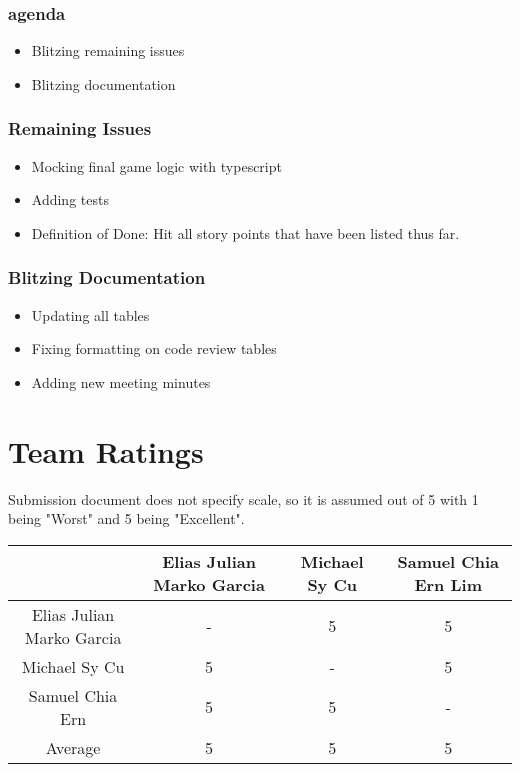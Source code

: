 \documentclass[11pt]{article}
\begin{document}
\subsubsection*{agenda}
\label{sec:org32cc65f}
\begin{itemize}
\item Blitzing remaining issues
\item Blitzing documentation
\end{itemize}
\subsubsection*{Remaining Issues}
\label{sec:org8f1f2a6}
\begin{itemize}
\item Mocking final game logic with typescript
\item Adding tests
\item Definition of Done: Hit all story points that have been listed thus far.
\end{itemize}
\subsubsection*{Blitzing Documentation}
\label{sec:orga550ed1}
\begin{itemize}
\item Updating all tables
\item Fixing formatting on code review tables
\item Adding new meeting minutes
\end{itemize}
\section{Team Ratings}
\label{sec:org638b8fb}
Submission document does not specify scale, so it is assumed out of 5 with 1 being "Worst" and 5
being "Excellent".

\begin{center}
\begin{tabular}{|c|c|c|c|}
\hline
 & Elias Julian Marko Garcia & Michael Sy Cu & Samuel Chia Ern Lim\\
\hline
Elias Julian Marko Garcia & - & 5 & 5\\
\hline
Michael Sy Cu & 5 & - & 5\\
\hline
Samuel Chia Ern & 5 & 5 & -\\
\hline
Average & 5 & 5 & 5\\
\hline
\end{tabular}
\end{center}
\end{document}
